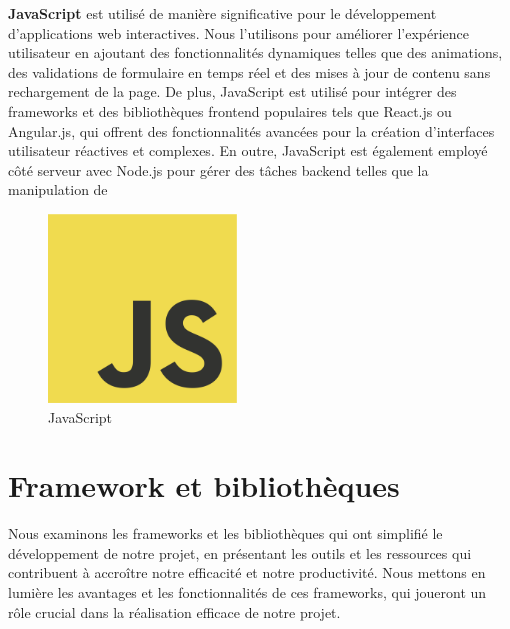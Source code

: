 \textbf{JavaScript} est utilisé de manière significative pour le développement d'applications web interactives. Nous l'utilisons pour améliorer l'expérience utilisateur en ajoutant des fonctionnalités dynamiques telles que des animations, des validations de formulaire en temps réel et des mises à jour de contenu sans rechargement de la page. De plus, JavaScript est utilisé pour intégrer des frameworks et des bibliothèques frontend populaires tels que React.js ou Angular.js, qui offrent des fonctionnalités avancées pour la création d'interfaces utilisateur réactives et complexes. En outre, JavaScript est également employé côté serveur avec Node.js pour gérer des tâches backend telles que la manipulation de
\\
\begin{figure}[H] 
    \centering
    \includegraphics[width=5cm]{Figures/javascript.png}
    \caption{JavaScript}
\end{figure}






\section{Framework et bibliothèques}

\hspace{\parindent}Nous examinons les frameworks et les bibliothèques qui ont simplifié le développement de notre projet, en présentant les outils et les ressources qui contribuent à accroître notre efficacité et notre productivité. Nous mettons en lumière les avantages et les fonctionnalités de ces frameworks, qui joueront un rôle crucial dans la réalisation efficace de notre projet.

